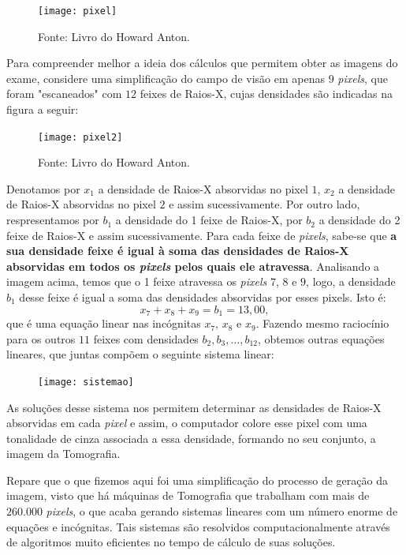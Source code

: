 \begin{knowledge}
\begin{figure}[H]
\centering
\noindent\texttt{[image: pixel]}
\caption{Fonte: Livro do Howard Anton.}
\end{figure}

Para compreender melhor a ideia dos cálculos que permitem obter as imagens do exame, considere uma simplificação do campo de visão em apenas $9$ \emph{pixels}, que foram "escaneados"{} com $12$ feixes de Raios-X, cujas densidades são indicadas na figura a seguir:

\begin{figure}[H]
\centering
\noindent\texttt{[image: pixel2]}
\caption{Fonte: Livro do Howard Anton.}
\end{figure}

Denotamos por $x_1$ a densidade de Raios-X absorvidas no pixel $1$, $x_2$ a densidade de Raios-X absorvidas no pixel $2$ e assim sucessivamente. Por outro lado, respresentamos por $b_1$ a densidade do 1 feixe de Raios-X, por $b_2$ a densidade do 2 feixe de Raios-X e assim sucessivamente. Para cada feixe de \emph{pixels}, sabe-se que \textbf{a sua densidade feixe é igual à soma das densidades de Raios-X absorvidas em todos os \emph{pixels} pelos quais ele atravessa}. Analisando a imagem acima, temos que o 1 feixe atravessa os \emph{pixels} $7$, $8$ e $9$, logo, a densidade $b_1$ desse feixe é igual a soma das densidades absorvidas por esses pixels. Isto é:
$$
x_7 + x_8 + x_9 = b_1 = 13,00,
$$
que é uma equação linear nas incógnitas $x_7$, $x_8$ e $x_9$. Fazendo mesmo raciocínio para os outros $11$ feixes com densidades $b_2, b_3, \ldots, b_{12}$, obtemos outras equações lineares, que juntas compõem o seguinte sistema linear:

\begin{figure}[H]
\centering
\noindent\texttt{[image: sistemao]}
\end{figure}

As soluções desse sistema nos permitem determinar as densidades de Raios-X absorvidas em cada \emph{pixel} e assim, o computador colore esse pixel com uma tonalidade de cinza associada a essa densidade, formando no seu conjunto, a imagem da Tomografia. 

Repare que o que fizemos aqui foi uma simplificação do processo de geração da imagem, visto que há máquinas de Tomografia que trabalham com mais de $260.000$ \emph{pixels}, o que acaba gerando sistemas lineares com um número enorme de equações e incógnitas. Tais sistemas são resolvidos computacionalmente através de algoritmos muito eficientes no tempo de cálculo de suas soluções.
\end{knowledge}




